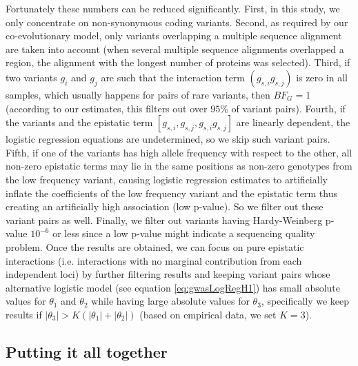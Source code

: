 Fortunately these numbers can be reduced significantly. 
First, in this study, we only concentrate on non-synonymous coding variants. 
Second, as required by our co-evolutionary model, only variants overlapping a multiple sequence alignment are taken into account (when several multiple sequence alignments overlapped a region, the alignment with the longest number of proteins was selected).
Third, if two variants $g_i$ and $g_j$ are such that the interaction term $(g_{s,i} g_{s,j})$ is zero in all samples, which usually happens for pairs of rare variants, then $BF_G = 1$ (according to our estimates, this filters out over $95 \%$ of variant pairs). 
Fourth, if the variants and the epistatic term $[g_{s,i}, g_{s,j}, g_{s,i} g_{s,j}]$ are linearly dependent, the logistic regression equations are undetermined, so we skip such variant pairs. 
Fifth, if one of the variants has high allele frequency with respect to the other, all non-zero epistatic terms may lie in the same positions as non-zero genotypes from the low frequency variant, causing logistic regression estimates to artificially inflate the coefficients of the low frequency variant and the epistatic term thus creating an artificially high association (low p-value). 
So we filter out these variant pairs as well. 
Finally, we filter out variants having Hardy-Weinberg p-value $10^{-6}$ or less since a low p-value might indicate a sequencing quality problem.
Once the results are obtained, we can focus on pure epistatic interactions (i.e. interactions with no marginal contribution from each independent loci) by further filtering results and keeping variant pairs whose alternative logistic model (see equation \ref{eq:gwasLogRegH1}) has small absolute values for $\theta_1$ and $\theta_2$ while having large absolute values for $\theta_3$, specifically we keep results if $|\theta_3| > K ( |\theta_1| + |\theta_2| )$ (based on empirical data, we set $K=3$). 

\subsection{Putting it all together}

